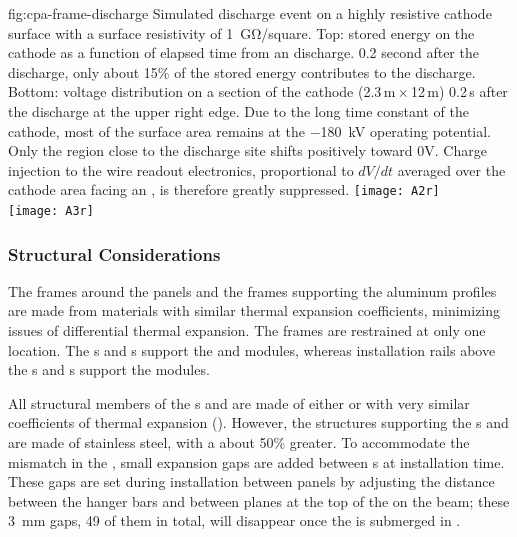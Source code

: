 \begin{dunefigure}
{fig:cpa-frame-discharge}
{Simulated discharge event on a highly resistive cathode surface with a surface resistivity of \SI{1}{\giga\ohm}/square. Top:  stored energy on the cathode as a function of elapsed time from an  discharge. 0.2 second after the discharge, only about 15\% of the stored energy contributes to the discharge. Bottom: voltage distribution on a section of the cathode (2.3\,m\,$\times$\,12\,m) 0.2\,s after the discharge at the upper right edge.  Due to the long time constant of the cathode, most of the surface area remains at the \SI{-180}{\kV} operating potential. Only the region close to the discharge site shifts positively toward 0V. Charge injection to the wire readout electronics, proportional to $dV/dt$ averaged over the cathode area facing an , is therefore greatly suppressed. }
\centering
\texttt{[image: A2r]} \\ \vspace{20pt}    %
\texttt{[image: A3r]}
\end{dunefigure}


\subsubsection{Structural Considerations}
\label{sec:fdsp-hv-des-des-sc}

The frames around the  panels and the frames supporting the  aluminum profiles  
are made from materials with similar thermal expansion coefficients, minimizing issues of differential thermal expansion. The  frames 
are restrained at only one location.  The s and s support the  and  modules, whereas installation rails above the s and s support the  modules. 

All structural members of the s and  are made of either \frfour or  with very similar coefficients of thermal expansion (). However, the structures supporting the s and  are made of stainless steel, with a  about 50\% greater.  To accommodate the mismatch in the , small expansion gaps are added between s at installation time. These gaps are set during installation between  panels by adjusting the distance between the  hanger bars and between  planes at the top of the  on the  beam; these \SI{3}{mm} gaps, 49 of them in total, will disappear once the  is submerged in . %
 
